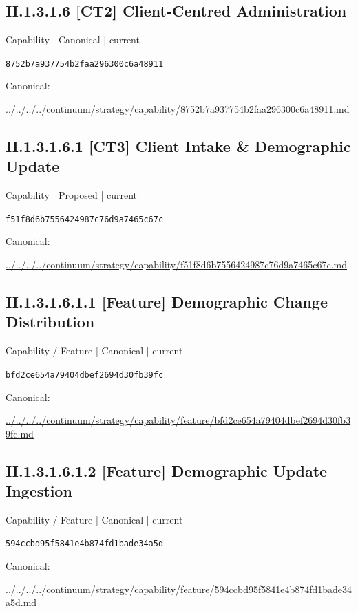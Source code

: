 \documentclass[10pt,a4paper]{article}
\begin{document}
\subsection*{II.1.3.1.6 [CT2] Client-Centred Administration}
{\small Capability | Canonical | current}\par
\texttt{8752b7a937754b2faa296300c6a48911}\par
Canonical: \par
{\footnotesize\url{../../../../continuum/strategy/capability/8752b7a937754b2faa296300c6a48911.md}}\par
\subsection*{II.1.3.1.6.1 [CT3] Client Intake \& Demographic Update}
{\small Capability | Proposed | current}\par
\texttt{f51f8d6b7556424987c76d9a7465c67c}\par
Canonical: \par
{\footnotesize\url{../../../../continuum/strategy/capability/f51f8d6b7556424987c76d9a7465c67c.md}}\par
\subsection*{II.1.3.1.6.1.1 [Feature] Demographic Change Distribution}
{\small Capability / Feature | Canonical | current}\par
\texttt{bfd2ce654a79404dbef2694d30fb39fc}\par
Canonical: \par
{\footnotesize\url{../../../../continuum/strategy/capability/feature/bfd2ce654a79404dbef2694d30fb39fc.md}}\par
\subsection*{II.1.3.1.6.1.2 [Feature] Demographic Update Ingestion}
{\small Capability / Feature | Canonical | current}\par
\texttt{594ccbd95f5841e4b874fd1bade34a5d}\par
Canonical: \par
{\footnotesize\url{../../../../continuum/strategy/capability/feature/594ccbd95f5841e4b874fd1bade34a5d.md}}\par
\end{document}
